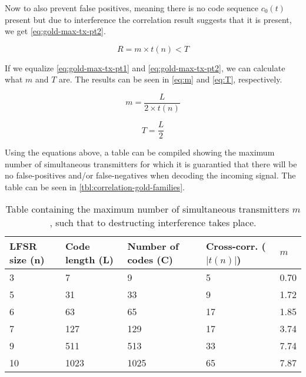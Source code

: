 Now to also prevent false positives, meaning there is no code sequence $c_0(t)$ present but due to interference the correlation result suggests that it is present, we get \autoref{eq:gold-max-tx-pt2}.


\begin{equation}
	\label{eq:gold-max-tx-pt2}
	R = m \times t(n) < T
\end{equation}

If we equalize \autoref{eq:gold-max-tx-pt1} and \autoref{eq:gold-max-tx-pt2}, we can calculate what $m$ and $T$ are.
The results can be seen in \autoref{eq:m} and \autoref{eq:T}, respectively.


\begin{equation}
	\label{eq:m}
	m = \frac{L}{2 \times t(n)}
\end{equation}

\begin{equation}
	\label{eq:T}
	T = \frac{L}{2}
\end{equation}


Using the equations above, a table can be compiled showing the maximum number of simultaneous transmitters for which it is guarantied that there will be no false-positives and/or false-negatives when decoding the incoming signal.
The table can be seen in \autoref{tbl:correlation-gold-families}.
 \cite{holmes2007spread}



\begin{table}[h]
	\centering
	\begin{tabular}{ | l | l | l | l | l |  }

		\hline
		LFSR size (n) 	& Code length (L)	& Number of codes (C)	& Cross-corr. ($|t(n)|$) 	& $m$	\\ \hline

		3				& 7					& 9						& 5							& 0.70	\\ \hline
		5				& 31				& 33					& 9							& 1.72	\\ \hline
		6				& 63				& 65					& 17						& 1.85	\\ \hline
		7				& 127				& 129					& 17						& 3.74	\\ \hline
		9				& 511				& 513					& 33						& 7.74	\\ \hline%
		10				& 1023				& 1025					& 65						& 7.87	\\ \hline	%

	\end{tabular}
	\caption{Table containing the maximum number of simultaneous transmitters $m$, such that to destructing interference takes place.}
	\label{tbl:correlation-gold-families}
\end{table}




